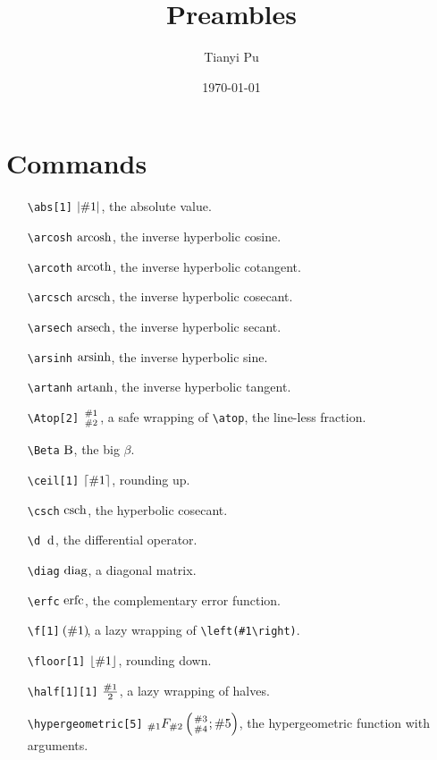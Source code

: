 \documentclass{article}
\title{Preambles}
\author{Tianyi Pu}
\date{\today}
\begin{document}
\maketitle

\section{Commands}
\begin{itemize}
    \item[\texttt{\textbackslash abs[1]}] $\abs{\#1}$, the absolute value.
    \item[\texttt{\textbackslash arcosh}] $\arcosh$, the inverse hyperbolic cosine.
    \item[\texttt{\textbackslash arcoth}] $\arcoth$, the inverse hyperbolic cotangent.
    \item[\texttt{\textbackslash arcsch}] $\arcsch$, the inverse hyperbolic cosecant.
    \item[\texttt{\textbackslash arsech}] $\arsech$, the inverse hyperbolic secant.
    \item[\texttt{\textbackslash arsinh}] $\arsinh$, the inverse hyperbolic sine.
    \item[\texttt{\textbackslash artanh}] $\artanh$, the inverse hyperbolic tangent.
    \item[\texttt{\textbackslash Atop[2]}] $\Atop{\#1}{\#2}$, a safe wrapping of \texttt{\textbackslash atop}, the line-less fraction.
    \item[\texttt{\textbackslash Beta}] $\Beta$, the big $\beta$.
    \item[\texttt{\textbackslash ceil[1]}] $\ceil{\#1}$, rounding up.
    \item[\texttt{\textbackslash csch}] $\csch$, the hyperbolic cosecant.
    \item[\texttt{\textbackslash d}] $\d$, the differential operator.
    \item[\texttt{\textbackslash diag}] $\diag$, a diagonal matrix.
    \item[\texttt{\textbackslash erfc}] $\erfc$, the complementary error function.
    \item[\texttt{\textbackslash f[1]}] $\f{\#1}$, a lazy wrapping of \texttt{\textbackslash left(\#1\textbackslash right)}.
    \item[\texttt{\textbackslash floor[1]}] $\floor{\#1}$, rounding down.
    \item[\texttt{\textbackslash half[1][1]}] $\half[\#1]$, a lazy wrapping of halves.
    \item[\texttt{\textbackslash hypergeometric[5]}] $\hypergeometric{\#1}{\#2}{\#3}{\#4}{\#5}$, the hypergeometric function with arguments.

\end{itemize}
\end{document}
